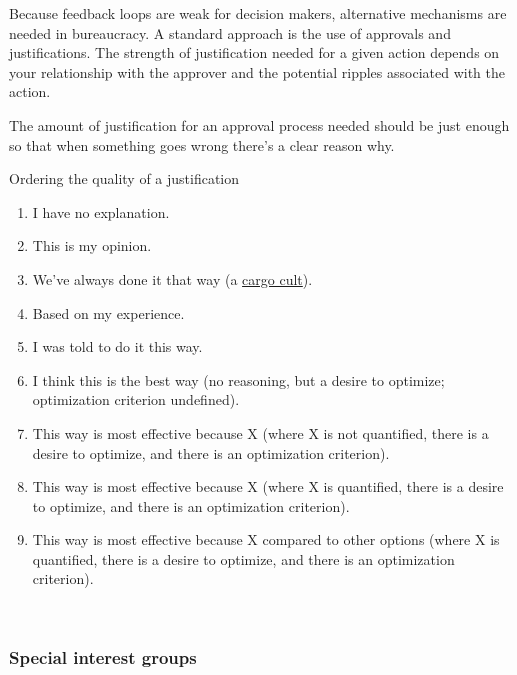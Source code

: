 
Because feedback loops are weak for decision makers, alternative mechanisms are needed in bureaucracy. A standard approach is the use of approvals and justifications. The strength of justification needed for a given action depends on your relationship with the approver and the potential ripples associated with the action. 

The amount of justification for an approval process needed should be just enough so that when something goes wrong there's a clear reason why. 

Ordering the quality of a justification
\begin{enumerate}
    \item I have no explanation.
    \item This is my opinion.
    \item We've always done it that way (a \href{https://en.wikipedia.org/wiki/Cargo_cult}{cargo cult}).
    \item Based on my experience.
    \item I was told to do it this way.
    \item I think this is the best way (no reasoning, but a desire to optimize; optimization criterion undefined).
    \item This way is most effective because X (where X is not quantified, there is a desire to optimize, and there is an optimization criterion).
    \item This way is most effective because X (where X is quantified, there is a desire to optimize, and there is an optimization criterion).
    \item This way is most effective because X compared to other options (where X is quantified, there is a desire to optimize, and there is an optimization criterion).
\end{enumerate}


\ \\



\subsubsection*{Special interest groups}

